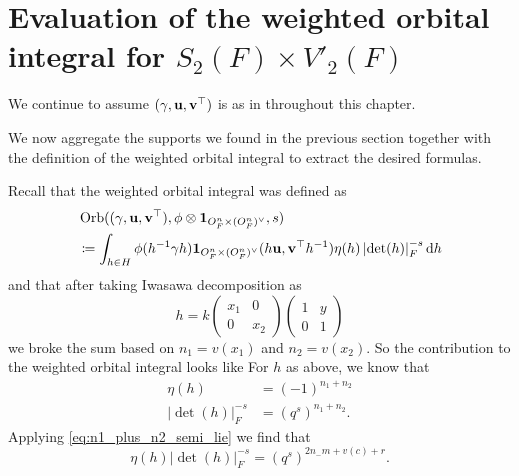 \chapter{Evaluation of the weighted orbital integral for $S_2(F) \times V'_2(F)$}
\label{ch:orbitalFJ2}

We continue to assume ${(\gamma, \mathbf u, \mathbf v^\top)}$ is as in  throughout this chapter.

We now aggregate the supports we found in the previous section together with the
definition of the weighted orbital integral to extract the desired formulas.

Recall that the weighted orbital integral was defined as
\begin{align*}
  & \Orb(\guv, \phi \otimes \oneV, s) \\
  &\coloneqq
  \int_{h \in H} \phi(h\inv \gamma h)
  \oneV(h \uu, \vv^\top h^{-1})
  \eta(h) \left\lvert \det(h) \right\rvert_F^{-s} \odif h
\end{align*}
and that after taking Iwasawa decomposition as
\[ h = k \begin{pmatrix} x_1 & 0 \\ 0 & x_2 \end{pmatrix}
  \begin{pmatrix} 1 & y \\ 0 & 1 \end{pmatrix} \]
we broke the sum based on $n_1 = v(x_1)$ and $n_2 = v(x_2)$.
So the contribution to the weighted orbital integral looks like
For $h$ as above, we know that
\begin{align*}
  \eta(h) &= (-1)^{n_1 + n_2} \\
  \left\lvert \det(h) \right\rvert^{-s}_F &= (q^s)^{n_1 + n_2}.
\end{align*}
Applying \eqref{eq:n1_plus_n2_semi_lie} we find that
\[
  \eta(h)
  \left\lvert \det(h) \right\rvert^{-s}_F
  = (q^s)^{2n_ - m + v(c) + r}.
\]

